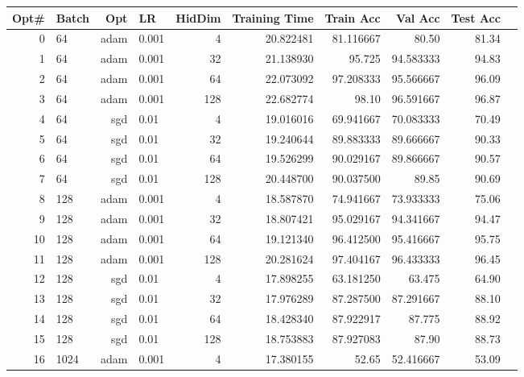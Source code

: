 \begin{solve}
\begin{enumerate}
        \begin{table}[H]
            \centering
        \begin{tabular}{rlrlrrrrrr}
            \toprule
            Opt\# & Batch & Opt & LR & HidDim& Training Time & Train Acc & Val Acc & Test Acc \\
            \midrule
            0 & 64 & adam & 0.001& 4 & 20.822481 & 81.116667 & 80.50 & 81.34 \\
            1 & 64 & adam & 0.001& 32 & 21.138930 & 95.725& 94.583333 & 94.83 \\
            2 & 64 & adam & 0.001& 64 & 22.073092 & 97.208333 & 95.566667 & 96.09 \\
            \rowcolor{yellow!50}
            3 & 64 & adam & 0.001& 128 & 22.682774 & 98.10 & 96.591667 & 96.87 \\
            4 & 64 & sgd & 0.01 & 4 & 19.016016 & 69.941667 & 70.083333 & 70.49 \\
            5 & 64 & sgd & 0.01 & 32 & 19.240644 & 89.883333 & 89.666667 & 90.33 \\
            6 & 64 & sgd & 0.01 & 64 & 19.526299 & 90.029167 & 89.866667 & 90.57 \\
            \rowcolor{orange!50}
            7 & 64 & sgd & 0.01 & 128 & 20.448700 & 90.037500 & 89.85 & 90.69 \\
            8 & 128 & adam & 0.001& 4 & 18.587870 & 74.941667 & 73.933333 & 75.06 \\
            9 & 128 & adam & 0.001& 32 & 18.807421 & 95.029167 & 94.341667 & 94.47 \\
            10 & 128 & adam & 0.001& 64 & 19.121340 & 96.412500 & 95.416667 & 95.75 \\
            \rowcolor{yellow!50}
            11 & 128 & adam & 0.001& 128 & 20.281624 & 97.404167 & 96.433333 & 96.45 \\            
            12 & 128 & sgd & 0.01 & 4 & 17.898255 & 63.181250 & 63.475& 64.90 \\
            13 & 128 & sgd & 0.01 & 32 & 17.976289 & 87.287500 & 87.291667 & 88.10 \\
            14 & 128 & sgd & 0.01 & 64 & 18.428340 & 87.922917 & 87.775& 88.92 \\
            15 & 128 & sgd & 0.01 & 128 & 18.753883 & 87.927083 & 87.90 & 88.73 \\
            \rowcolor{red!50}
            16 & 1024 & adam & 0.001& 4 & 17.380155 & 52.65 & 52.416667 & 53.09 \\

\end{tabular}
\end{table}
\end{enumerate}
\end{solve}
